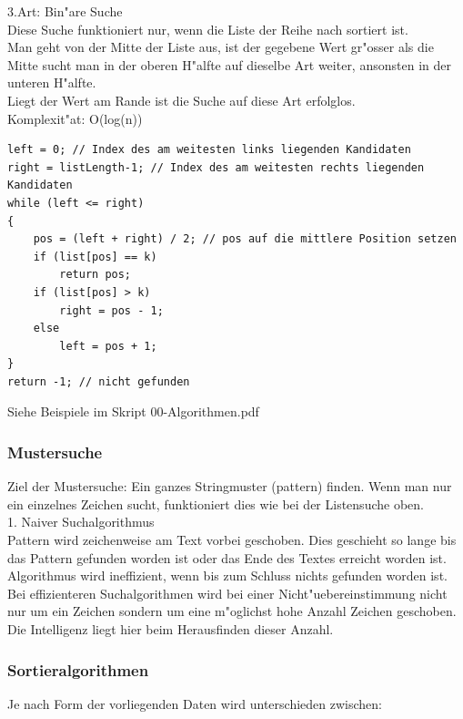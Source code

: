 3.Art: Bin"are Suche\\
Diese Suche funktioniert nur, wenn die Liste der Reihe nach sortiert ist.\\
Man geht von der Mitte der Liste aus, ist der gegebene Wert gr"osser als die Mitte sucht man in der oberen H"alfte auf dieselbe Art weiter, ansonsten in der unteren H"alfte.\\
Liegt der Wert am Rande ist die Suche auf diese Art erfolglos.\\
Komplexit"at: O(log(n))\\
\begin{lstlisting}[style=C]
left = 0; // Index des am weitesten links liegenden Kandidaten
right = listLength-1; // Index des am weitesten rechts liegenden Kandidaten
while (left <= right)
{
	pos = (left + right) / 2; // pos auf die mittlere Position setzen
	if (list[pos] == k)
		return pos;
	if (list[pos] > k)
		right = pos - 1;
	else
		left = pos + 1;
}
return -1; // nicht gefunden

\end{lstlisting} 
Siehe Beispiele im Skript 00-Algorithmen.pdf

\subsubsection{Mustersuche}
Ziel der Mustersuche: Ein ganzes Stringmuster (pattern) finden. Wenn man nur ein einzelnes Zeichen sucht, funktioniert dies wie bei der Listensuche oben.\\
1. Naiver Suchalgorithmus\\
Pattern wird zeichenweise am Text vorbei geschoben. Dies geschieht so lange bis das Pattern gefunden worden ist oder das Ende des Textes erreicht worden ist. Algorithmus wird ineffizient, wenn bis zum Schluss nichts gefunden worden ist.\\
Bei effizienteren Suchalgorithmen wird bei einer Nicht"uebereinstimmung nicht nur um ein Zeichen sondern um eine m"oglichst hohe Anzahl Zeichen geschoben. Die Intelligenz liegt hier beim Herausfinden dieser Anzahl.\\



\subsubsection{Sortieralgorithmen}
Je nach Form der vorliegenden Daten wird unterschieden zwischen: 

